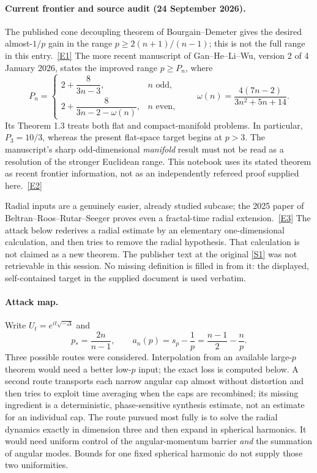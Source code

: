 \documentclass[11pt]{article}
\newcommand{\sref}[2]{\hyperlink{source:#1:#2}{[S#2]}}
\newcommand{\eref}[2]{\hyperlink{extra:#1:#2}{[E#2]}}
\begin{document}
	\paragraph{Current frontier and source audit (24 September 2026).}
	The published cone decoupling theorem of Bourgain--Demeter gives the desired
	almost-$1/p$ gain in the range $p\geq 2(n+1)/(n-1)$; this is not the full
	range in this entry.\ \eref{statement}{1}
	The more recent manuscript of Gan--He--Li--Wu, version 2 of 4 January 2026,
	states the improved range $p\geq P_n$, where
	\begin{equation}\label{statement:frontier}
		P_n=\begin{cases}
			2+\dfrac{8}{3n-3},&n\text{ odd},\\[4pt]
			2+\dfrac{8}{3n-2-\omega(n)},&n\text{ even},
		\end{cases}
		\qquad \omega(n)=\frac{4(7n-2)}{3n^2+5n+14}.
	\end{equation}
	Its Theorem 1.3 treats both flat and compact-manifold problems. In particular,
	$P_3=10/3$, whereas the present flat-space target begins at $p>3$.
	The manuscript's sharp odd-dimensional \emph{manifold} result must not be
	read as a resolution of the stronger Euclidean range. This notebook uses
	its stated theorem as recent frontier information, not as an independently
	refereed proof supplied here.\ \eref{statement}{2}
	
	Radial inputs are a genuinely easier, already studied subcase; the 2025
	paper of Beltran--Roos--Rutar--Seeger proves even a fractal-time radial
	extension.\ \eref{statement}{3} The attack below rederives a radial estimate by
	an elementary one-dimensional calculation, and then tries to remove the
	radial hypothesis. That calculation is not claimed as a new theorem.
	The publisher text at the original \sref{statement}{1} was not retrievable in
	this session. No missing definition is filled in from it: the displayed,
	self-contained target in the supplied document is used verbatim.
	
	\paragraph{Attack map.}
	Write $U_t=e^{it\sqrt{-\Delta}}$ and
	\[
	p_* =\frac{2n}{n-1},\qquad
	a_n(p)=s_p-\frac1p=\frac{n-1}{2}-\frac np.
	\]
	Three possible routes were considered. Interpolation from an available
	large-$p$ theorem would need a better low-$p$ input; the exact loss is
	computed below. A second route transports each narrow angular cap almost
	without distortion and then tries to exploit time averaging when the caps
	are recombined; its missing ingredient is a deterministic, phase-sensitive
	synthesis estimate, not an estimate for an individual cap. The route
	pursued most fully is to solve the radial dynamics exactly in dimension
	three and then expand in spherical harmonics. It would need uniform
	control of the angular-momentum barrier \emph{and} the summation of angular
	modes. Bounds for one fixed spherical harmonic do not supply those two
	uniformities.
	
\end{document}
